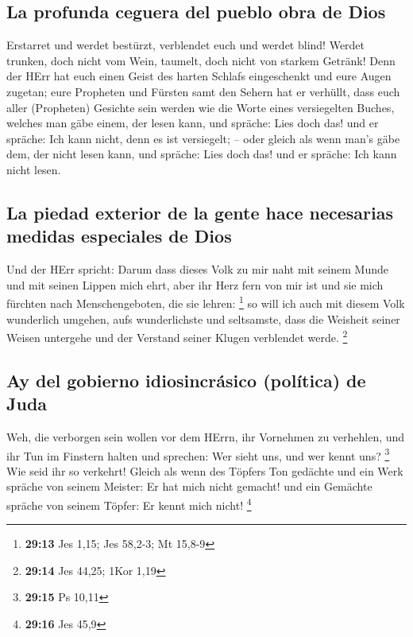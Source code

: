 \hypertarget{la-profunda-ceguera-del-pueblo-obra-de-dios}{%
\subsection{La profunda ceguera del pueblo obra de
Dios}\label{la-profunda-ceguera-del-pueblo-obra-de-dios}}

 Erstarret und werdet bestürzt, verblendet euch und werdet
blind! Werdet trunken, doch nicht vom Wein, taumelt, doch nicht von
starkem Getränk!  Denn der HErr hat euch einen Geist des
harten Schlafs eingeschenkt und eure Augen zugetan; eure Propheten und
Fürsten samt den Sehern hat er verhüllt,  dass euch aller
(Propheten) Gesichte sein werden wie die Worte eines versiegelten
Buches, welches man gäbe einem, der lesen kann, und spräche: Lies doch
das! und er spräche: Ich kann nicht, denn es ist versiegelt; --
 oder gleich als wenn man's gäbe dem, der nicht lesen
kann, und spräche: Lies doch das! und er spräche: Ich kann nicht lesen.

\hypertarget{la-piedad-exterior-de-la-gente-hace-necesarias-medidas-especiales-de-dios}{%
\subsection{La piedad exterior de la gente hace necesarias medidas
especiales de
Dios}\label{la-piedad-exterior-de-la-gente-hace-necesarias-medidas-especiales-de-dios}}

 Und der HErr spricht: Darum dass dieses Volk zu mir naht
mit seinem Munde und mit seinen Lippen mich ehrt, aber ihr Herz fern von
mir ist und sie mich fürchten nach Menschengeboten, die sie lehren:
\footnote{\textbf{29:13} Jes 1,15; Jes 58,2-3; Mt 15,8-9}
 so will ich auch mit diesem Volk wunderlich umgehen,
aufs wunderlichste und seltsamste, dass die Weisheit seiner Weisen
untergehe und der Verstand seiner Klugen verblendet werde. \footnote{\textbf{29:14}
  Jes 44,25; 1Kor 1,19}

\hypertarget{ay-del-gobierno-idiosincruxe1sico-poluxedtica-de-juda}{%
\subsection{Ay del gobierno idiosincrásico (política) de
Juda}\label{ay-del-gobierno-idiosincruxe1sico-poluxedtica-de-juda}}

 Weh, die verborgen sein wollen vor dem HErrn, ihr
Vornehmen zu verhehlen, und ihr Tun im Finstern halten und sprechen: Wer
sieht uns, und wer kennt uns? \footnote{\textbf{29:15} Ps 10,11}
 Wie seid ihr so verkehrt! Gleich als wenn des Töpfers
Ton gedächte und ein Werk spräche von seinem Meister: Er hat mich nicht
gemacht! und ein Gemächte spräche von seinem Töpfer: Er kennt mich
nicht! \footnote{\textbf{29:16} Jes 45,9}

